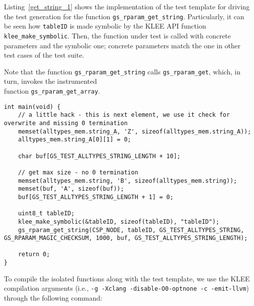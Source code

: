Listing~\ref{get_string_1} shows the implementation of the test template for driving the test generation for the function \texttt{gs\_rparam\_get\_string}. Particularly, it can be seen how \texttt{tableID} is made symbolic by the KLEE API function \texttt{klee\_make\_symbolic}. Then, the function under test is called with concrete parameters and the symbolic one; concrete parameters match the one in other test cases of the \PARAM test suite.

Note that the function \texttt{gs\_rparam\_get\_string} calls \texttt{gs\_rparam\_get}, which, in turn, invokes the instrumented \\
function \texttt{gs\_rparam\_get\_array}.

\begin{lstlisting}[style=CStyle,float=t, caption=Test template for function gs\_rparam\_get\_string., label=get_string_1]
int main(void) {
    // a little hack - this is next element, we use it check for overwrite and missing 0 termination
    memset(alltypes_mem.string_A, 'Z', sizeof(alltypes_mem.string_A));
    alltypes_mem.string_A[0][1] = 0;

    char buf[GS_TEST_ALLTYPES_STRING_LENGTH + 10];

    // get max size - no 0 termination
    memset(alltypes_mem.string, 'B', sizeof(alltypes_mem.string));
    memset(buf, 'A', sizeof(buf));
    buf[GS_TEST_ALLTYPES_STRING_LENGTH + 1] = 0;

    uint8_t tableID;
    klee_make_symbolic(&tableID, sizeof(tableID), "tableID");
    gs_rparam_get_string(CSP_NODE, tableID, GS_TEST_ALLTYPES_STRING, GS_RPARAM_MAGIC_CHECKSUM, 1000, buf, GS_TEST_ALLTYPES_STRING_LENGTH);

    return 0;
}
\end{lstlisting}

To compile the isolated functions along with the test template, we use the KLEE compilation arguments (i.e., \texttt{-g -Xclang -disable-O0-optnone -c -emit-llvm}) through the following command:

